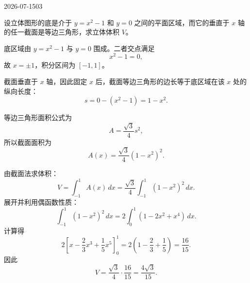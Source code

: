 \begin{mistake}{2026-07-15}{03}

\begin{problemcontent}
设立体图形的底是介于 \(y=x^2-1\) 和 \(y=0\) 之间的平面区域，而它的垂直于 \(x\) 轴的任一截面是等边三角形，求立体体积 \(V\)。
\end{problemcontent}

\begin{solutioncontent}
底区域由 \(y=x^2-1\) 与 \(y=0\) 围成。二者交点满足
\[
x^2-1=0,
\]
故 \(x=\pm1\)，积分区间为 \([-1,1]\)。

截面垂直于 \(x\) 轴，因此固定 \(x\) 后，截面等边三角形的边长等于底区域在该 \(x\) 处的纵向长度：
\[
s=0-(x^2-1)=1-x^2.
\]

等边三角形面积公式为
\[
A=\frac{\sqrt{3}}{4}s^2,
\]
所以截面面积为
\[
A(x)=\frac{\sqrt{3}}{4}(1-x^2)^2.
\]

由截面法求体积：
\[
V=\int_{-1}^{1}A(x)\,dx
=\frac{\sqrt{3}}{4}\int_{-1}^{1}(1-x^2)^2\,dx.
\]
展开并利用偶函数性质：
\[
\int_{-1}^{1}(1-x^2)^2\,dx
=2\int_0^1(1-2x^2+x^4)\,dx.
\]
计算得
\[
2\left[x-\frac{2}{3}x^3+\frac{1}{5}x^5\right]_0^1
=2\left(1-\frac{2}{3}+\frac{1}{5}\right)
=\frac{16}{15}.
\]
因此
\[
V=\frac{\sqrt{3}}{4}\cdot\frac{16}{15}=\frac{4\sqrt{3}}{15}.
\]
\end{solutioncontent}


\end{mistake}
